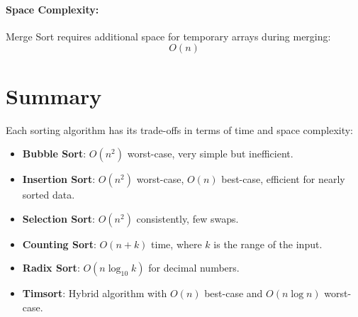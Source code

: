 \paragraph{Space Complexity:}  
Merge Sort requires additional space for temporary arrays during merging:
\[
O(n)
\]

\section*{Summary}
Each sorting algorithm has its trade-offs in terms of time and space complexity:
\begin{itemize}
  \item \textbf{Bubble Sort}: \(O(n^2)\) worst-case, very simple but inefficient.
  \item \textbf{Insertion Sort}: \(O(n^2)\) worst-case, \(O(n)\) best-case, efficient for nearly sorted data.
  \item \textbf{Selection Sort}: \(O(n^2)\) consistently, few swaps.
  \item \textbf{Counting Sort}: \(O(n + k)\) time, where \(k\) is the range of the input.
  \item \textbf{Radix Sort}: \(O(n \log_{10} k)\) for decimal numbers.
  \item \textbf{Timsort}: Hybrid algorithm with \(O(n)\) best-case and \(O(n \log n)\) worst-case.
\end{itemize}
